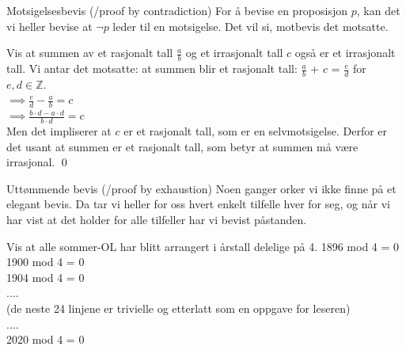 \begin{frame}{Motsigelsesbevis (/proof by contradiction)}
    For å bevise en proposisjon $p$, kan det vi heller bevise at $\lnot p$ leder til en motsigelse. Det vil si, motbevis det motsatte.
    
    \begin{block}{Vis at summen av et rasjonalt tall $\frac{a}{b}$ og et irrasjonalt tall $c$ også er et irrasjonalt tall.}
    Vi antar det motsatte: at summen blir et rasjonalt tall: $\frac{a}{b}$ + $c$ = $\frac{e}{d}$ for $e, d \in \mathbb{Z}$.\\
    $\implies \frac{e}{d} - \frac{a}{b} = c$\\
    $\implies \frac{b\cdot d - a \cdot d}{b\cdot d} = c$\\
    Men det impliserer at $c$ er et rasjonalt tall, som er en selvmotsigelse. Derfor er det usant at summen er et rasjonalt tall, som betyr at summen må være irrasjonal. 
    \qed
    
    \end{block}
\end{frame}

\begin{frame}{Uttømmende bevis (/proof by exhaustion)}
    Noen ganger orker vi ikke finne på et elegant bevis. Da tar vi heller for oss hvert enkelt tilfelle hver for seg, og når vi har vist at det holder for alle tilfeller har vi bevist påstanden. \\
    
    \begin{block}{Vis at alle sommer-OL har blitt arrangert i årstall delelige på 4.}
        1896 mod 4 = 0 \checkmark \\
        1900 mod 4 = 0 \checkmark \\
        1904 mod 4 = 0 \checkmark \\
        .... \\
        (de neste 24 linjene er trivielle og etterlatt som en oppgave for leseren)\\
        ....\\
        2020 mod 4 = 0 \checkmark
    \end{block}
\end{frame}

